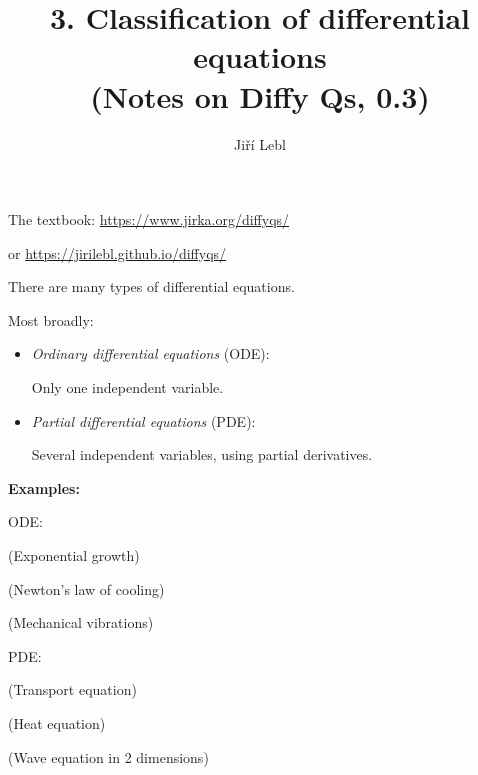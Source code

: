 \documentclass[10pt,aspectratio=169]{beamer}
\author{Ji\v{r}\'i Lebl}
\institute[OSU]{%
Oklahoma State University%
}
\title{3. Classification of differential equations\\(Notes on Diffy Qs, 0.3)}
\date{}
\begin{document}
\begin{frame}
\titlepage


\begin{center}
The textbook: \url{https://www.jirka.org/diffyqs/}

or \url{https://jirilebl.github.io/diffyqs/}
\end{center}
\end{frame}

\begin{frame}
There are many types of differential equations.

\medskip
\pause

Most broadly:

\begin{itemize}
\item
\pause
\emph{Ordinary differential equations} (ODE):

Only one independent variable.
\item
\pause
\emph{Partial differential equations} (PDE):

Several independent variables, using partial derivatives.
\end{itemize}

\end{frame}

\begin{frame}

\textbf{Examples:}

\medskip

ODE:

\medskip
\pause

\quad{}\hspace*{2in}%
(Exponential growth)

\medskip
\pause

\quad{}\hspace*{2in}%
(Newton's law of cooling)

\medskip
\pause

\quad{}\hspace*{2in}%
(Mechanical vibrations)

\medskip
\pause

PDE:

\medskip
\pause

\quad{}\hspace*{2in}%
(Transport equation)

\medskip
\pause

\quad{}\hspace*{2in}%
(Heat equation)
\medskip
\pause

\quad{}\hspace*{2in}%
(Wave equation in 2 dimensions)

\end{frame}
\end{document}
